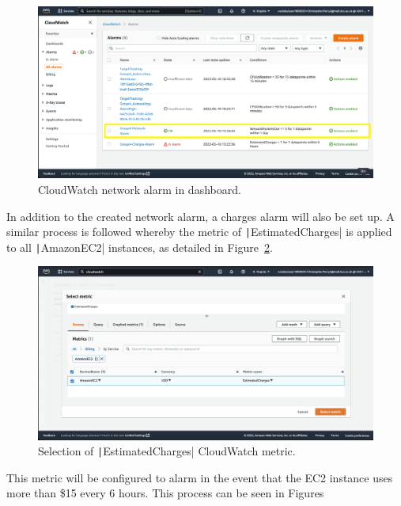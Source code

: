 \begin{figure}[!htbp]
    \centering
    \includegraphics[width=\textwidth]{resources/cloudwatch/cloudwatch-network-alarm-complete}
    \caption{CloudWatch network alarm in dashboard.}
    \label{fig:cloudwatch-network-alarm}
\end{figure}

In addition to the created network alarm, a charges alarm will also be set up.
A similar process is followed whereby the metric of \texttt|EstimatedCharges| is applied to all
\texttt|AmazonEC2| instances, as detailed in Figure~\ref{fig:cloudwatch-metric-charges}.

\begin{figure}[!htbp]
    \centering
    \includegraphics[width=\textwidth]{resources/cloudwatch/cloudwatch-metric-charges}
    \caption{Selection of \texttt|EstimatedCharges| CloudWatch metric.}
    \label{fig:cloudwatch-metric-charges}
\end{figure}

This metric will be configured to alarm in the event that the EC2 instance uses more than \$15 every 6 hours.
This process can be seen in Figures

